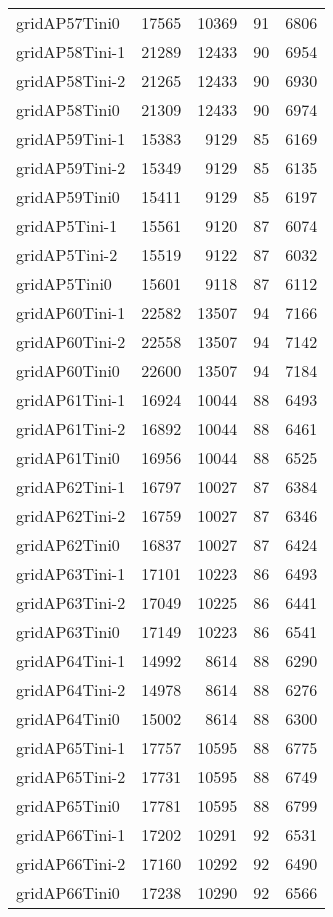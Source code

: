 \begin{longtable}{lrrrr}
gridAP57Tini0 & 17565 & 10369 & 91 & 6806 \\
gridAP58Tini-1 & 21289 & 12433 & 90 & 6954 \\
gridAP58Tini-2 & 21265 & 12433 & 90 & 6930 \\
gridAP58Tini0 & 21309 & 12433 & 90 & 6974 \\
gridAP59Tini-1 & 15383 & 9129 & 85 & 6169 \\
gridAP59Tini-2 & 15349 & 9129 & 85 & 6135 \\
gridAP59Tini0 & 15411 & 9129 & 85 & 6197 \\
gridAP5Tini-1 & 15561 & 9120 & 87 & 6074 \\
gridAP5Tini-2 & 15519 & 9122 & 87 & 6032 \\
gridAP5Tini0 & 15601 & 9118 & 87 & 6112 \\
gridAP60Tini-1 & 22582 & 13507 & 94 & 7166 \\
gridAP60Tini-2 & 22558 & 13507 & 94 & 7142 \\
gridAP60Tini0 & 22600 & 13507 & 94 & 7184 \\
gridAP61Tini-1 & 16924 & 10044 & 88 & 6493 \\
gridAP61Tini-2 & 16892 & 10044 & 88 & 6461 \\
gridAP61Tini0 & 16956 & 10044 & 88 & 6525 \\
gridAP62Tini-1 & 16797 & 10027 & 87 & 6384 \\
gridAP62Tini-2 & 16759 & 10027 & 87 & 6346 \\
gridAP62Tini0 & 16837 & 10027 & 87 & 6424 \\
gridAP63Tini-1 & 17101 & 10223 & 86 & 6493 \\
gridAP63Tini-2 & 17049 & 10225 & 86 & 6441 \\
gridAP63Tini0 & 17149 & 10223 & 86 & 6541 \\
gridAP64Tini-1 & 14992 & 8614 & 88 & 6290 \\
gridAP64Tini-2 & 14978 & 8614 & 88 & 6276 \\
gridAP64Tini0 & 15002 & 8614 & 88 & 6300 \\
gridAP65Tini-1 & 17757 & 10595 & 88 & 6775 \\
gridAP65Tini-2 & 17731 & 10595 & 88 & 6749 \\
gridAP65Tini0 & 17781 & 10595 & 88 & 6799 \\
gridAP66Tini-1 & 17202 & 10291 & 92 & 6531 \\
gridAP66Tini-2 & 17160 & 10292 & 92 & 6490 \\
gridAP66Tini0 & 17238 & 10290 & 92 & 6566 \\

\end{longtable}
